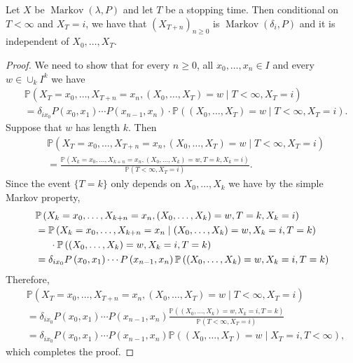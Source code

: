\documentclass[a4paper,11pt]{article}
\begin{document}
\begin{theorem}
    Let $X$ be $\operatorname{Markov}(\lambda, P)$ and let $T$ be a stopping time. Then conditional on $T<\infty$ and $X_T=i$, we have that $\left(X_{T+n}\right)_{n \geq 0}$ is $\operatorname{Markov}\left(\delta_i, P\right)$ and it is independent of $X_0, \ldots, X_T$.
\end{theorem}
\begin{proof}
    We need to show that for every $n \geq 0$, all $x_0, \ldots, x_n \in I$ and every $w \in \cup_k I^k$ we have
    \[
    \begin{aligned}
    &\mathbb{P}\left(X_T=x_0, \ldots, X_{T+n}=x_n,\left(X_0, \ldots, X_T\right)=w \mid T<\infty, X_T=i\right) \\
    &=\delta_{i x_0} P\left(x_0, x_1\right) \cdots P\left(x_{n-1}, x_n\right) \cdot \mathbb{P}\left(\left(X_0, \ldots, X_T\right)=w \mid T<\infty, X_T=i\right) .
    \end{aligned}
    \]
    Suppose that $w$ has length $k$. Then
    \[
    \begin{aligned}
    &\mathbb{P}\left(X_T=x_0, \ldots, X_{T+n}=x_n,\left(X_0, \ldots, X_T\right)=w \mid T<\infty, X_T=i\right) \\
    &=\frac{\mathbb{P}\left(X_k=x_0, \ldots, X_{k+n}=x_n,\left(X_0, \ldots, X_k\right)=w, T=k, X_k=i\right)}{\mathbb{P}\left(T<\infty, X_T=i\right)} .
    \end{aligned}
    \]
    Since the event $\{T=k\}$ only depends on $X_0, \ldots, X_k$ we have by the simple Markov property,
    \[
    \begin{aligned}
    &\mathbb{P}\left(X_k=x_0, \ldots, X_{k+n}=x_n,\left(X_0, \ldots, X_k\right)=w, T=k, X_k=i\right) \\
    &=\mathbb{P}\left(X_k=x_0, \ldots, X_{k+n}=x_n \mid\left(X_0, \ldots, X_k\right)=w, X_k=i, T=k\right)\\ 
    &\hspace{1.5em} \cdot \mathbb{P}\left(\left(X_0, \ldots, X_k\right)=w, X_k=i, T=k\right) \\
    &=\delta_{i x_0} P\left(x_0, x_1\right) \cdots P\left(x_{n-1}, x_n\right) \mathbb{P}\left(\left(X_0, \ldots, X_k\right)=w, X_k=i, T=k\right)
    \end{aligned}
    \]
    Therefore,
    \[
    \begin{aligned}
    &\mathbb{P}\left(X_T=x_0, \ldots, X_{T+n}=x_n,\left(X_0, \ldots, X_T\right)=w \mid T<\infty, X_T=i\right) \\
    &=\delta_{i x_0} P\left(x_0, x_1\right) \cdots P\left(x_{n-1}, x_n\right) \frac{\mathbb{P}\left(\left(X_0, \ldots, X_k\right)=w, X_k=i, T=k\right)}{\mathbb{P}\left(T<\infty, X_T=i\right)} \\
    &=\delta_{i x_0} P\left(x_0, x_1\right) \cdots P\left(x_{n-1}, x_n\right) \mathbb{P}\left(\left(X_0, \ldots, X_T\right)=w \mid X_T=i, T<\infty\right),
    \end{aligned}
    \]
    which completes the proof.
\end{proof}
\end{document}
